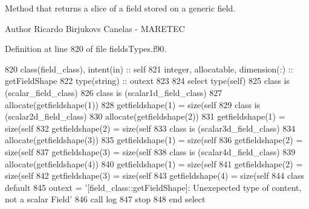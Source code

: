 Method that returns a slice of a field stored on a generic field. 

\begin{DoxyAuthor}{Author}
Ricardo Birjukovs Canelas -\/ M\+A\+R\+E\+T\+EC 
\end{DoxyAuthor}


Definition at line 820 of file fields\+Types.\+f90.


\begin{DoxyCode}
820     \textcolor{keywordtype}{class}(field\_class), \textcolor{keywordtype}{intent(in)} :: self
821     \textcolor{keywordtype}{integer}, \textcolor{keywordtype}{allocatable}, \textcolor{keywordtype}{dimension(:)} :: getFieldShape
822     \textcolor{keywordtype}{type}(string) :: outext
823 
824     \textcolor{keywordflow}{select type}(self)
825 \textcolor{keywordflow}{    class is} (scalar\_field\_class)
826 \textcolor{keywordflow}{    class is} (scalar1d\_field\_class)
827         \textcolor{keyword}{allocate}(getfieldshape(1))
828         getfieldshape(1) = \textcolor{keyword}{size}(self%
829 \textcolor{keywordflow}{    class is} (scalar2d\_field\_class)
830         \textcolor{keyword}{allocate}(getfieldshape(2))
831         getfieldshape(1) = \textcolor{keyword}{size}(self%
832         getfieldshape(2) = \textcolor{keyword}{size}(self%
833 \textcolor{keywordflow}{    class is} (scalar3d\_field\_class)
834         \textcolor{keyword}{allocate}(getfieldshape(3))
835         getfieldshape(1) = \textcolor{keyword}{size}(self%
836         getfieldshape(2) = \textcolor{keyword}{size}(self%
837         getfieldshape(3) = \textcolor{keyword}{size}(self%
838 \textcolor{keywordflow}{    class is} (scalar4d\_field\_class)
839         \textcolor{keyword}{allocate}(getfieldshape(4))
840         getfieldshape(1) = \textcolor{keyword}{size}(self%
841         getfieldshape(2) = \textcolor{keyword}{size}(self%
842         getfieldshape(3) = \textcolor{keyword}{size}(self%
843         getfieldshape(4) = \textcolor{keyword}{size}(self%
844 \textcolor{keywordflow}{        class default}
845         outext = \textcolor{stringliteral}{'[field\_class::getFieldShape]: Unexepected type of content, not a scalar Field'}
846         \textcolor{keyword}{call }log%
847         stop
848 \textcolor{keywordflow}{    end select}
\end{DoxyCode}
\mbox{\label{namespacefieldtypes__mod_ac35041b0ab166699a4fda1d0fa02ec67}} 

